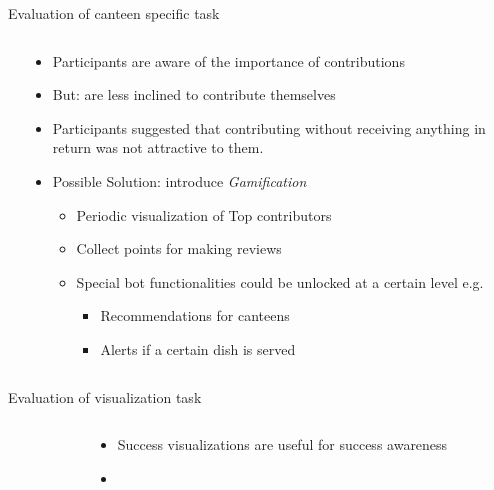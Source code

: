 \begin{frame}{Evaluation of canteen specific task}
  \begin{columns}
    \begin{column}[t]{0.5\textwidth}
      
    \end{column}
    \begin{column}[t]{0.5\textwidth}
      \begin{itemize}
        \item Participants are aware of the importance of contributions
        \item But: are less inclined to contribute themselves
       \item Participants suggested that contributing without receiving anything in return was not attractive to them.
        \item Possible Solution: introduce \emph{Gamification}
        \begin{itemize}
          \item Periodic visualization of Top contributors 
          \item Collect points for making reviews
          \item Special bot functionalities could be unlocked at a certain level e.g.
          \begin{itemize}
            \item Recommendations for canteens
            \item Alerts if a certain dish is served
          \end{itemize} 
        \end{itemize}
      \end{itemize}
    \end{column}
  \end{columns}
\end{frame}

\begin{frame}{Evaluation of visualization task}
  \begin{columns}
    \begin{column}[t]{0.5\textwidth}
      
    \end{column}
    \begin{column}[t]{0.5\textwidth}
      \begin{itemize}
        \item Success visualizations are useful for success awareness
        \item 
      \end{itemize}
    \end{column}
  \end{columns}
\end{frame}


